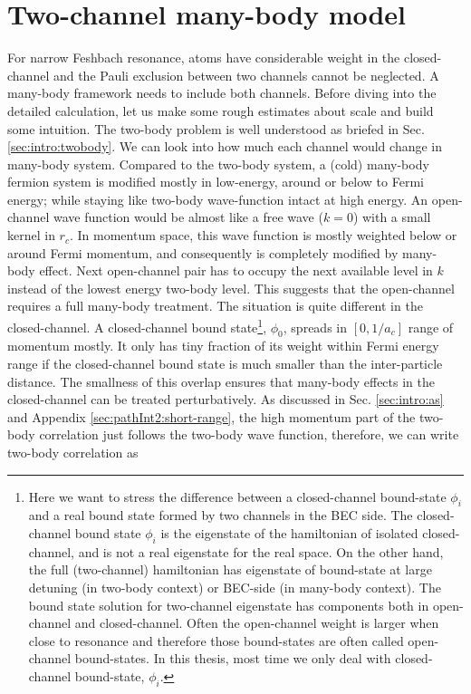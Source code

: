 
\chapter{Two-channel many-body model\label{ch:path2}}
For narrow Feshbach resonance, atoms have considerable weight in the closed-channel and the Pauli exclusion between two channels cannot be neglected.  A many-body framework needs to include both channels.  Before diving into the detailed calculation, let us make some rough estimates about scale and build some intuition.  The two-body problem is well understood as briefed in Sec. \ref{sec:intro:twobody}.  %
We can look into how much each channel would change  in many-body system.  Compared to the two-body system, a (cold) many-body fermion system is modified mostly in  low-energy,  around or below to Fermi energy; while staying like two-body wave-function intact at high energy.  An open-channel wave function would be  almost like a free wave ($k=0$) with a small kernel in $r_c$.  In momentum space, this wave function is mostly weighted below or around Fermi momentum, and consequently is completely modified by many-body effect. Next open-channel pair has to occupy the next available level in $k$ instead of the lowest energy two-body level.  This suggests that the open-channel requires a full many-body treatment.  The situation is quite different in the closed-channel.  A closed-channel bound state\footnote{Here we want to stress the difference between a closed-channel bound-state $\phi_{i}$ and a real bound state formed by two channels in the BEC side.   The closed-channel bound state $\phi_{i}$ is the eigenstate of the hamiltonian of isolated closed-channel, and is not a real eigenstate for the real space.  On the other hand, the full (two-channel) hamiltonian has eigenstate of bound-state at large detuning (in two-body context) or BEC-side (in many-body context).  The bound state solution for two-channel eigenstate has components both in open-channel and closed-channel.  Often the open-channel weight is larger when close to resonance and therefore those bound-states are often called open-channel bound-states.  In this thesis, most time we only deal with closed-channel bound-state, $\phi_{i}$.},  $\phi_{0}$, spreads in $[0,1/a_{c}]$ range of momentum mostly.  It only has tiny fraction of its weight within Fermi energy range if the closed-channel bound state is much smaller than the inter-particle distance. The smallness of this overlap ensures that many-body effects in the closed-channel can be  treated perturbatively.  As discussed in Sec. \ref{sec:intro:as} and Appendix \ref{sec:pathInt2:short-range}, the high momentum part of the two-body correlation just follows the two-body wave function,  therefore, we can write two-body correlation as 
